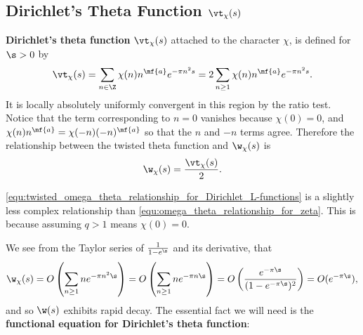     \subsection*{Dirichlet's Theta Function \texorpdfstring{$\vt_{\chi}(s)$}{\vt_{\chi}(s)}}
      \textbf{Dirichlet's theta function} $\vt_{\chi}(s)$ attached to the character $\chi$, is defined for $\s > 0$ by
      \[
        \vt_{\chi}(s) = \sum_{n \in \Z}\chi(n)n^{\mf{a}}e^{-\pi n^{2}s} = 2\sum_{n \ge 1}\chi(n)n^{\mf{a}}e^{-\pi n^{2}s}.
      \]
      It is locally absolutely uniformly convergent in this region by the ratio test. Notice that the term corresponding to $n = 0$ vanishes because $\chi(0) = 0$, and $\chi(n)n^{\mf{a}} = \chi(-n)(-n)^{\mf{a}}$ so that the $n$ and $-n$ terms agree. Therefore the relationship between the twisted theta function and $\w_{\chi}(s)$ is
      \begin{equation}\label{equ:twisted_omega_theta_relationship_for_Dirichlet_L-functions}
        \w_{\chi}(s) = \frac{\vt_{\chi}(s)}{2}.
      \end{equation}

      \begin{remark}
        \cref{equ:twisted_omega_theta_relationship_for_Dirichlet_L-functions} is a slightly less complex relationship than \cref{equ:omega_theta_relationship_for_zeta}. This is because assuming $q > 1$ means $\chi(0) = 0$.
      \end{remark}

      We see from the Taylor series of $\frac{1}{1-e^{\s}}$ and its derivative, that
      \[
        \w_{\chi}(s) = O\left(\sum_{n \ge 1}ne^{-\pi n^{2}\s}\right) = O\left(\sum_{n \ge 1}ne^{-\pi n\s}\right) = O\left(\frac{e^{-\pi \s}}{(1-e^{-\pi\s})^{2}}\right) = O(e^{-\pi\s}),
      \]
      and so $\w(s)$ exhibits rapid decay. The essential fact we will need is the \textbf{functional equation for Dirichlet's theta function}:

